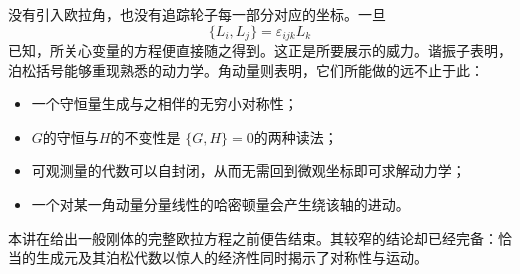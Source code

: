 没有引入欧拉角，也没有追踪轮子每一部分对应的坐标。一旦\[
  \{L_i,L_j\}=\varepsilon_{ijk}L_k
\]已知，所关心变量的方程便直接随之得到。这正是所要展示的威力。谐振子表明，泊松括号能够重现熟悉的动力学。角动量则表明，它们所能做的远不止于此：
\begin{itemize}
  \item 一个守恒量生成与之相伴的无穷小对称性；
  \item \(G\)的守恒与\(H\)的不变性是
  \(\{G,H\}=0\)的两种读法；
  \item 可观测量的代数可以自封闭，从而无需回到微观坐标即可求解动力学；
  \item 一个对某一角动量分量线性的哈密顿量会产生绕该轴的进动。
\end{itemize}
本讲在给出一般刚体的完整欧拉方程之前便告结束。其较窄的结论却已经完备：恰当的生成元及其泊松代数以惊人的经济性同时揭示了对称性与运动。